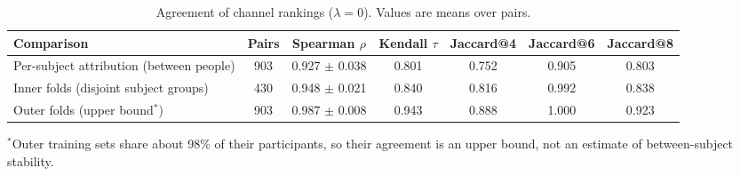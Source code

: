 \begin{table}[t]
\centering
\small
\caption{Agreement of channel rankings ($\lambda = 0$). Values are means over pairs.}
\label{tab:stability}
\begin{tabular}{lcccccc}
\toprule
Comparison & Pairs & Spearman $\rho$ & Kendall $\tau$ & Jaccard@4 & Jaccard@6 & Jaccard@8 \\
\midrule
Per-subject attribution (between people) & 903 & 0.927 $\pm$ 0.038 & 0.801 & 0.752 & 0.905 & 0.803 \\
Inner folds (disjoint subject groups) & 430 & 0.948 $\pm$ 0.021 & 0.840 & 0.816 & 0.992 & 0.838 \\
Outer folds (upper bound$^*$) & 903 & 0.987 $\pm$ 0.008 & 0.943 & 0.888 & 1.000 & 0.923 \\
\bottomrule
\end{tabular}
\par\smallskip\parbox{0.95\linewidth}{\footnotesize $^*$Outer training sets share about 98\% of their participants, so their agreement is an upper bound, not an estimate of between-subject stability.}
\end{table}
